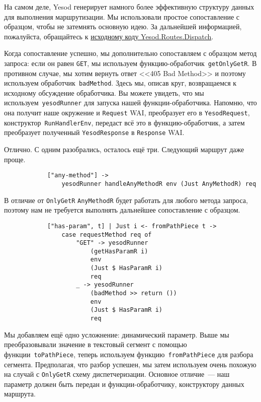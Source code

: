 \begin{remark}
    На самом деле, Yesod генерирует намного более эффективную структуру данных
    для выполнения маршрутизации. Мы использовали простое сопоставление с
    образцом, чтобы не затемнять основную идею. За дальнейшей информацией,
    пожалуйста, обращайтесь к
    \href{https://github.com/yesodweb/yesod/blob/master/yesod-routes/Yesod/Routes/Dispatch.lhs}%
    {исходному коду Yesod.Routes.Dispatch}.
\end{remark}

Когда сопоставление успешно, мы дополнительно сопоставляем с образцом метод
запроса: если он равен \texttt{GET}, мы используем
функцию-обработчик~\lstinline'getOnlyGetR'. В противном случае, мы хотим
вернуть ответ <<405 Bad Method>> и поэтому используем
обработчик~\lstinline'badMethod'. Здесь мы, описав круг, возвращаемся к
исходному обсуждение обработчика. Вы можете увидеть, что мы
используем~\lstinline'yesodRunner' для запуска нашей функции-обработчика.
Напомню, что она получит наше окружение и \lstinline'Request' WAI, преобразует
его в \lstinline'YesodRequest', конструктор~\lstinline'RunHandlerEnv', передаст
всё это в функцию-обработчик, а затем преобразует полученный
\lstinline'YesodResponse' в \lstinline'Response' WAI.

Отлично. С одним разобрались, осталось ещё три. Следующий маршрут даже проще.

\begin{lstlisting}
            ["any-method"] ->
                yesodRunner handleAnyMethodR env (Just AnyMethodR) req
\end{lstlisting}

В отличие от \lstinline'OnlyGetR' \lstinline'AnyMethodR' будет работать для
любого метода запроса, поэтому нам не требуется выполнять дальнейшее
сопоставление с образцом.

\begin{lstlisting}
            ["has-param", t] | Just i <- fromPathPiece t ->
                case requestMethod req of
                    "GET" -> yesodRunner
                        (getHasParamR i)
                        env
                        (Just $ HasParamR i)
                        req
                    _ -> yesodRunner
                        (badMethod >> return ())
                        env
                        (Just $ HasParamR i)
                        req
\end{lstlisting}

Мы добавляем ещё одно усложнение: динамический параметр. Выше мы
преобразовывали значение в текстовый сегмент с помощью
функции~\lstinline'toPathPiece', теперь используем
функцию~\lstinline'fromPathPiece' для разбора сегмента. Предполагая, что разбор
успешен, мы затем используем очень похожую на случай с \lstinline'OnlyGetR'
схему диспетчеризации. Основное отличие~--- наш параметр должен быть передан и
функции-обработчику, конструктору данных маршрута.

